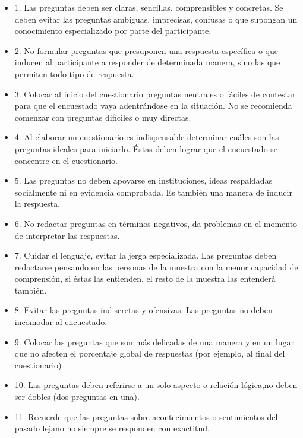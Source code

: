 \documentclass[11pt]{article}
\begin{document}
\begin{itemize}
\item 1. Las preguntas deben ser claras, sencillas, comprensibles y
concretas. Se deben evitar las preguntas ambiguas, imprecisas,
confusas o que supongan un conocimiento especializado por parte del
participante.

\item 2. No formular preguntas que presuponen una respuesta específica o que
inducen al participante a responder de determinada manera, sino las
que permiten todo tipo de respuesta.

\item 3. Colocar al inicio del cuestionario preguntas neutrales o fáciles de
contestar para que el encuestado vaya adentrándose en la
situación. No se recomienda comenzar con preguntas difíciles o muy directas.

\item 4. Al elaborar un cuestionario es indispensable determinar cuáles son
las preguntas ideales para iniciarlo. Éstas deben lograr que el
encuestado se concentre en el cuestionario.

\item 5. Las preguntas no deben apoyarse en instituciones, ideas respaldadas
socialmente ni en evidencia comprobada. Es también una manera de
inducir la respuesta.

\item 6. No redactar preguntas en términos negativos, da problemas en el
momento de interpretar las respuestas.

\item 7. Cuidar el lenguaje, evitar la jerga especializada. Las preguntas
deben redactarse pensando en las personas de la muestra con la menor
capacidad de comprensión, si éstas las entienden, el resto de la
muestra las entenderá también.

\item 8. Evitar las preguntas indiscretas y ofensivas. Las preguntas no
deben incomodar al encuestado.

\item 9. Colocar las preguntas que son más delicadas de una manera y en un
lugar que no afecten el porcentaje global de respuestas (por
ejemplo, al final del cuestionario)

\item 10. Las preguntas deben referirse a un solo aspecto o relación lógica,no
deben ser dobles (dos preguntas en una).

\item 11. Recuerde que las preguntas sobre acontecimientos o sentimientos
del pasado lejano no siempre se responden con exactitud.


\end{itemize}
\end{document}
